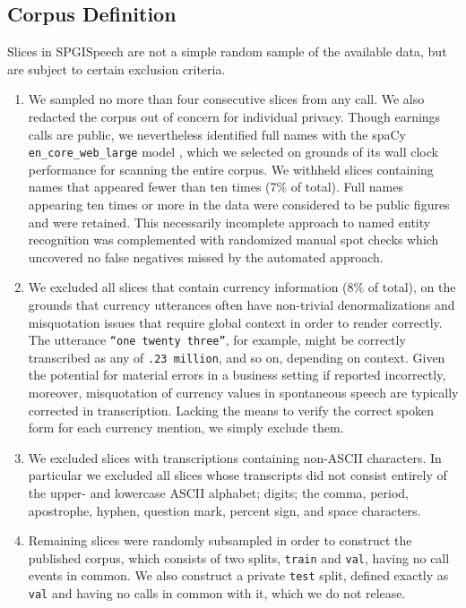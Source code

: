 \documentclass{article}
\newcommand{\corpus}{SPGISpeech}
\begin{document}
\subsection{Corpus Definition}


Slices in \corpus{} are not a simple random sample of the available data, but are subject to certain exclusion criteria.
\begin{enumerate}
\item We sampled no more than four consecutive slices from any call.
We also redacted the corpus out of concern for individual privacy.
Though earnings calls are public, we nevertheless identified full
names with the spaCy \texttt{en\_core\_web\_large} model
\cite{honnibal17}, which we selected on grounds of its wall clock
performance for scanning the entire corpus.  We withheld slices
containing names that appeared fewer than ten times (7\% of total).
Full names appearing ten times or more in the data were considered to
be public figures and were retained.  This necessarily incomplete
approach to named entity recognition was complemented with randomized
manual spot checks which uncovered no false negatives missed by the
automated approach.

\item We excluded all slices that contain currency information (8\% of
total), on the grounds that currency utterances often have non-trivial
denormalizations and misquotation issues that require global context
in order to render correctly.  The utterance \texttt{``one twenty
  three''}, for example, might be correctly transcribed as any of
\texttt{\1.23 million}, and
so on, depending on context.  Given the potential for material errors
in a business setting if reported incorrectly, moreover, misquotation of
currency values in spontaneous speech are typically corrected in
transcription.  Lacking the means to verify the correct spoken form
for each currency mention, we simply exclude them.


\item We excluded slices with transcriptions containing non-ASCII
characters.  
In particular we excluded all slices whose
transcripts did not consist entirely of the upper- and lowercase ASCII
alphabet; digits; the comma, period, apostrophe, hyphen, question
mark, percent sign, and space characters.

\item Remaining slices were randomly subsampled in order to construct
the published corpus, which consists of two splits, \texttt{train}
and \texttt{val}, having no call events in common.  We also construct a private \texttt{test} split, defined exactly as \texttt{val} and having no calls in common with it, which we do not release.
\end{enumerate}
\end{document}

